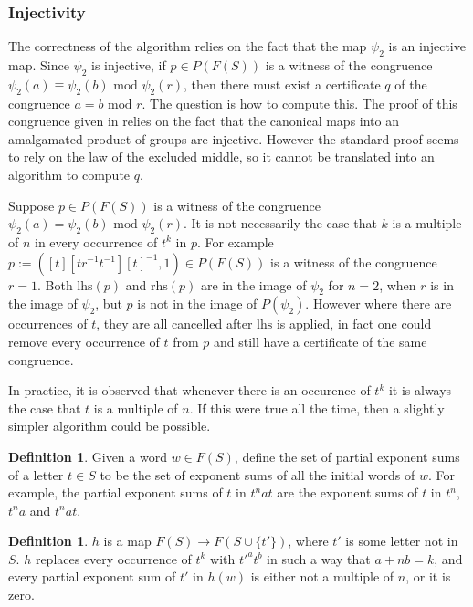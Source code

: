 \documentclass[11pt]{article} %
\theoremstyle{definition}
\theoremstyle{definition}
\theoremstyle{definition}
\theoremstyle{definition}
\theoremstyle{definition}
\newtheorem{defn}[theorem]{Definition}
\theoremstyle{definition}
\begin{document}
\subsubsection{Injectivity}%

The correctness of the algorithm relies on the fact that the map $\psi_2$ is an injective map.
Since $\psi_2$ is injective, if $p \in P(F(S))$ is a witness of the congruence
$\psi_2(a) \equiv \psi_2(b) \text{ mod } \psi_2(r)$, then there must exist a certificate
$q$ of the congruence $a = b \text{ mod }r$. The question is how to compute this. The proof
of this congruence given in \cite{PutmanOneRelator} relies on the fact that the canonical maps into an amalgamated product
of groups are injective. However the standard proof
seems to rely on the law of the excluded middle, so
it cannot be translated into an algorithm to compute $q$.

Suppose $p \in P(F(S))$ is a witness of the congruence
$\psi_2(a) = \psi_2(b) \text{ mod } \psi_2(r)$. It is not necessarily the case that $k$
is a multiple of $n$ in every occurrence of $t^k$ in $p$. For example
$p := ([t][tr^{-1}t^{-1}][t]^{-1}, 1) \in P(F(S))$ is a witness of the congruence
$r = 1$. Both $\text{lhs}(p)$ and $\text{rhs}(p)$ are in the image of
$\psi_2$ for $n = 2$, when $r$ is in the image of $\psi_2$,
but $p$ is not in the image of $P(\psi_2)$. However where there are
occurrences of $t$, they are all cancelled after $\text{lhs}$ is applied, in fact
one could remove every occurrence of $t$ from $p$ and still have a certificate of the same
congruence.

In practice, it is observed that whenever there is an occurence of $t^k$ it is always
the case that $t$ is a multiple of $n$. If this were true all the time, then a slightly
simpler algorithm could be possible.

\begin{defn}
  Given a word $w \in F(S)$, define the set of partial exponent sums of a letter $t \in S$ to
  be the set of exponent sums of all the initial words of $w$. For example, the partial
  exponent sums of $t$ in $t^n a t$ are the exponent sums of $t$ in
  $t^n$, $t^na$ and $t^nat$.
\end{defn}

\begin{defn}
  $h$ is a map $F(S) \to F(S \cup \{t'\})$, where $t'$ is some letter not in $S$.
  $h$ replaces every occurrence of $t^k$ with $t'^at^b$ in such a way that $a + n b = k$,
  and every partial exponent sum of $t'$ in $h(w)$ is either not a multiple of $n$,
  or it is zero.
\end{defn}
\end{document}
